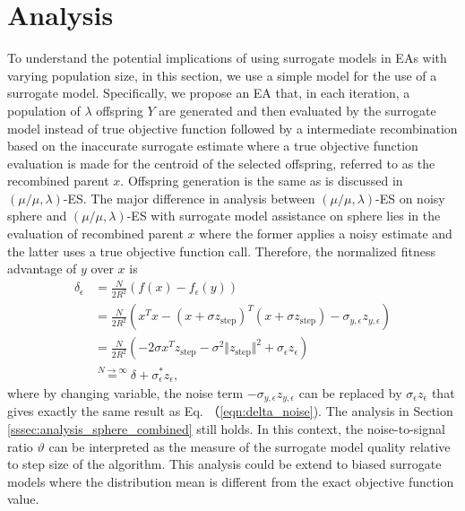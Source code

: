 

\section{Analysis}\label{sec:analysis}

To understand the potential implications of using surrogate models in EAs with varying population size, in this section, we use a simple model for the use of a surrogate model. Specifically, we propose an EA that, in each iteration, a population of $\lambda$ offspring $Y$ are generated and then evaluated by the surrogate model instead of true objective function followed by a intermediate recombination based on the inaccurate surrogate estimate where a true objective function evaluation is made for the centroid of the selected offspring, referred to as the recombined parent $x$. Offspring generation is the same as is discussed in $(\mu/\mu,\lambda)$-ES. The major difference in analysis between $(\mu/\mu,\lambda)$-ES on noisy sphere and $(\mu/\mu,\lambda)$-ES with surrogate model assistance on sphere lies in the evaluation of recombined parent $x$ where the former applies a noisy estimate and the latter uses a true objective function call. Therefore, the normalized fitness advantage of $y$ over $x$ is
\begin{align}
\delta_\epsilon &=  \frac{N}{2R^2}\left( f(x) - f_\epsilon(y)\right)  \nonumber\\ 
& = \frac{N}{2R^2} (x^Tx - (x+\sigma z_{\text{step}})^T (x+\sigma z_{\text{step}}) -\sigma_{y,\epsilon} z_{y,\epsilon}) \nonumber\\
& = \frac{N}{2R^2} (-2 \sigma x^Tz_{\text{step}} - \sigma^2 \Vert z_{\text{step}}\Vert^2 +\sigma_\epsilon z_\epsilon) \nonumber\\
&\overset{N \rightarrow \infty}{=} \delta+\sigma_\epsilon^* z_\epsilon, \label{eqn:delta_surrogate}{}
\end{align}
where by changing variable, the noise term $-\sigma_{y,\epsilon} z_{y,\epsilon}$ can be replaced by $\sigma_\epsilon z_\epsilon$ that gives exactly the same result as Eq. （\ref{eqn:delta_noise}). The analysis in Section \ref{sssec:analysis_sphere_combined} still holds. In this context, the noise-to-signal ratio $\vartheta$ can be interpreted as the measure of the surrogate model quality relative to step size of the algorithm. This analysis could be extend to biased surrogate models where the distribution mean is different from the exact objective function value\cite{DBLP:conf/ppsn/KayhaniA18}. 

